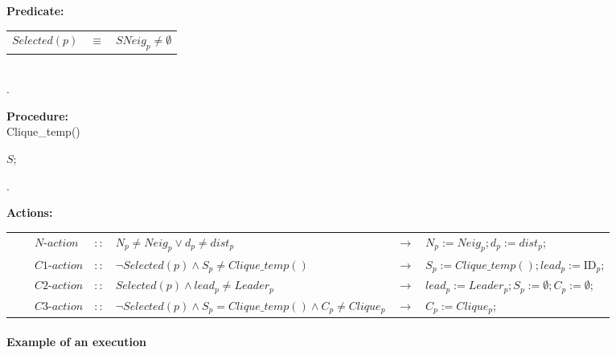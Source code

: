 \documentclass[11pt,letterpaper,onecolumn]{article}
\newcommand{\id}{\mbox{ID}}
\begin{document}
\begin{algorithm}[t]
\begin{scriptsize}
{\bf Predicate:}\\
\begin{tabular}{lll}
$Selected(p)$ & $\equiv$ & $SNeig_p \neq \emptyset$\\
\end{tabular}\\
.\dotfill\

{\bf Procedure:}\\
Clique\_temp()
\begin{algorithmic}[1]
\ENDIF
\ENDFOR
\RETURN $S$;

\end{algorithmic}
.\dotfill\


{\bf Actions:}\\
\begin{tabular}{lllllll}
&& $N$-$action$  & $::$ & $N_p \neq Neig_p \vee d_p \neq dist_p$ & $\to$ & $N_p:=Neig_p; d_p:=dist_p$;\\
&& $C1$-$action$ & $::$ & $\neg Selected(p) \wedge S_p \neq Clique\_temp()$ & $\to$ & $S_p:=Clique\_temp();lead_p:=\id_p$;\\
&& $C2$-$action$ & $::$ & $Selected(p) \wedge lead_p \neq Leader_p$ & $\to$ & $lead_p:=Leader_p; S_p:=\emptyset; C_p:=\emptyset$;\\
&& $C3$-$action$ & $::$ & $\neg Selected(p) \wedge S_p=Clique\_temp() \wedge C_p \neq Clique_p$ & $\to$ & $C_p:=Clique_p$;\\
\end{tabular}
\end{scriptsize}
\end{algorithm}

\paragraph{Example of an execution}
\end{document}
